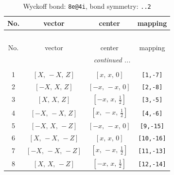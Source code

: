 \documentclass[fleqn,8pt]{jsarticle}
\begin{document}
\begin{longtable}{cccc}
\caption{Wyckoff bond: {\tt 8e@4i}, bond symmetry: {\tt ..2}}
 \\
 \hline \hline
No. & vector & center & mapping \\ \hline \endfirsthead

\multicolumn{3}{l}{\tablename\ \thetable{}} \\
 \hline \hline
No. & vector & center & mapping \\ \hline \endhead

 \hline \hline
\multicolumn{3}{r}{\footnotesize\it continued ...} \\ \endfoot

 \hline \hline
\multicolumn{3}{r}{} \\ \endlastfoot

1 & $\left[ X,\, - X,\, Z \right]$ & $\left[ x,\, x,\, 0 \right]$ & {\tt [1,-7]} \\ \hline
2 & $\left[ - X,\, X,\, Z \right]$ & $\left[ - x,\, - x,\, 0 \right]$ & {\tt [2,-8]} \\ \hline
3 & $\left[ X,\, X,\, Z \right]$ & $\left[ - x,\, x,\, \frac{1}{2} \right]$ & {\tt [3,-5]} \\ \hline
4 & $\left[ - X,\, - X,\, Z \right]$ & $\left[ x,\, - x,\, \frac{1}{2} \right]$ & {\tt [4,-6]} \\ \hline
5 & $\left[ - X,\, X,\, - Z \right]$ & $\left[ - x,\, - x,\, 0 \right]$ & {\tt [9,-15]} \\ \hline
6 & $\left[ X,\, - X,\, - Z \right]$ & $\left[ x,\, x,\, 0 \right]$ & {\tt [10,-16]} \\ \hline
7 & $\left[ - X,\, - X,\, - Z \right]$ & $\left[ x,\, - x,\, \frac{1}{2} \right]$ & {\tt [11,-13]} \\ \hline
8 & $\left[ X,\, X,\, - Z \right]$ & $\left[ - x,\, x,\, \frac{1}{2} \right]$ & {\tt [12,-14]} \\
\end{longtable}
\renewcommand{\arraystretch}{1.2}
\end{document}
